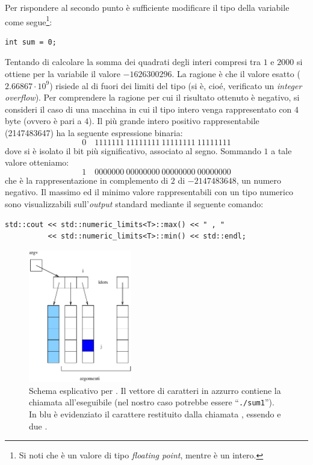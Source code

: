 Per rispondere al secondo punto \`e sufficiente modificare il tipo
della variabile  come segue\footnote{Si noti che  \`e
  un valore di tipo \emph{floating point}, mentre  \`e un
  intero.}:
\begin{lstlisting}
int sum = 0;
\end{lstlisting}
Tentando di calcolare la somma dei quadrati degli interi compresi tra
$1$ e $2000$ si ottiene per la variabile  il valore
$-1626300296$. La ragione \`e che il valore esatto ($2.66867\cdot
10^9$) risiede al di fuori dei limiti del tipo  (si \`e,
cio\'e, verificato un \emph{integer overflow}). Per comprendere la
ragione per cui il risultato ottenuto \`e negativo, si consideri il
caso di una macchina in cui il tipo intero venga rappresentato con $4$
byte (ovvero  \`e pari a $4$). Il pi\`u grande intero
positivo rappresentabile (2147483647) ha la seguente espressione
binaria:
\begin{equation*}
0\quad 1111111~11111111~11111111~11111111
\end{equation*}
dove si \`e isolato il bit pi\`u significativo, associato al
segno. Sommando $1$ a tale valore otteniamo:
\begin{equation*}
1\quad 0000000~00000000~00000000~00000000
\end{equation*}
che \`e la rappresentazione in complemento di $2$ di $-2147483648$, un
numero negativo. Il massimo ed il minimo valore rappresentabili con un
tipo numerico  sono visualizzabili sull'\emph{output} standard
mediante il seguente comando:
\begin{lstlisting}
std::cout << std::numeric_limits<T>::max() << " , "
          << std::numeric_limits<T>::min() << std::endl;
\end{lstlisting}
%
\begin{figure}
\centering
{}
\includegraphics[width=0.4\textwidth]{./figures/eps/argv.eps}
\caption{Schema esplicativo per . Il vettore di caratteri in
  azzurro contiene la chiamata all'eseguibile (nel nostro caso
  potrebbe essere ``\texttt{./sum1}''). In blu \`e evidenziato il
  carattere restituito dalla chiamata , essendo
   e  due .}
\label{fig:argv}
\end{figure}
